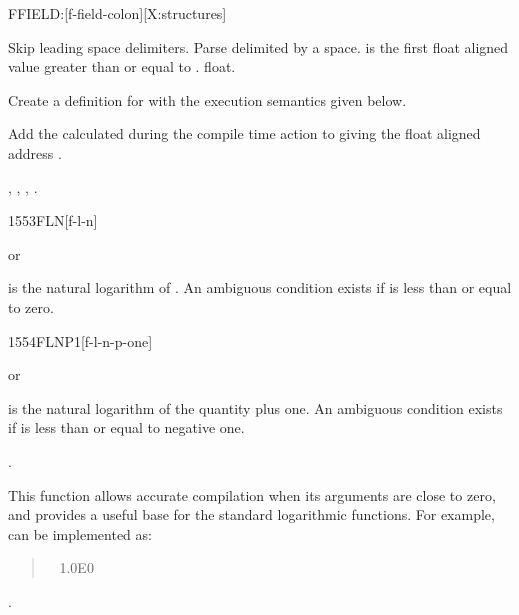 
\begin{worddef}{}{FFIELD:}[f-field-colon][X:structures]
\item {}

	Skip leading space delimiters. Parse  delimited by
	a space.  is the first float aligned value greater
	than or equal to .   float.

	Create a definition for  with the execution semantics
	given below.

\execute[name] 

	Add the  calculated during the compile time action
	to  giving the float aligned address
	.

\see {},
	,
	, \linebreak
	.
\end{worddef}


\begin{worddef}{1553}{FLN}[f-l-n]
\item {} or

	 is the natural logarithm of . An ambiguous
	condition exists if  is less than or equal to zero.
\end{worddef}


\begin{worddef}{1554}{FLNP1}[f-l-n-p-one]
\item {} or

	 is the natural logarithm of the quantity 
	plus one. An ambiguous condition exists if  is less
	than or equal to negative one.

\see {}.

	\begin{rationale} %
		This function allows accurate compilation when its arguments
		are close to zero, and provides a useful base for the standard
		logarithmic functions. For example,  can be
		implemented as:

		\begin{quote}\ttfamily
			\word[core]{:}  ~
				1.0E0  ~ 
			\word[core]{;}
		\end{quote}
	\see {}.
	\end{rationale}
\end{worddef}


